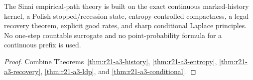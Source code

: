 \begin{theorem}
\label{thm:r21-a3-main}
The Sinai empirical-path theory is built on the exact continuous
marked-history kernel, a Polish stopped/recession state, entropy-controlled
compactness, a legal recovery theorem, explicit good rates, and sharp
conditional Laplace principles.  No one-step countable surrogate and no
point-probability formula for a continuous prefix is used.
\end{theorem}

\begin{proof}
Combine Theorems~\ref{thm:r21-a3-history},
\ref{thm:r21-a3-entropy}, \ref{thm:r21-a3-recovery},
\ref{thm:r21-a3-ldp}, and \ref{thm:r21-a3-conditional}.
\end{proof}
